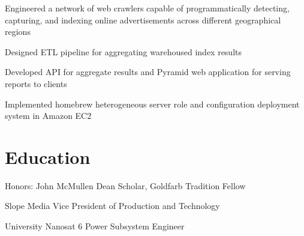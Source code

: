 \documentclass[]{deedy-resume-openfont}
\begin{document}
    \begin{tightemize}
        \item
            Engineered a network of web crawlers capable of programmatically
            detecting, capturing, and indexing online advertisements across
            different geographical regions
        \item
            Designed ETL pipeline for aggregating warehoused index results
        \item
            Developed API for aggregate results and Pyramid web application for
            serving reports to clients
        \item
            Implemented homebrew heterogeneous server role and configuration
            deployment system in Amazon EC2
    \end{tightemize}

\section{Education}
    \begin{tightemize}
    \item
        Honors: John McMullen Dean Scholar, Goldfarb Tradition Fellow
    \item
        Slope Media Vice President of Production and Technology
    \item
        University Nanosat 6 Power Subsystem Engineer
    \end{tightemize}
\end{document}
